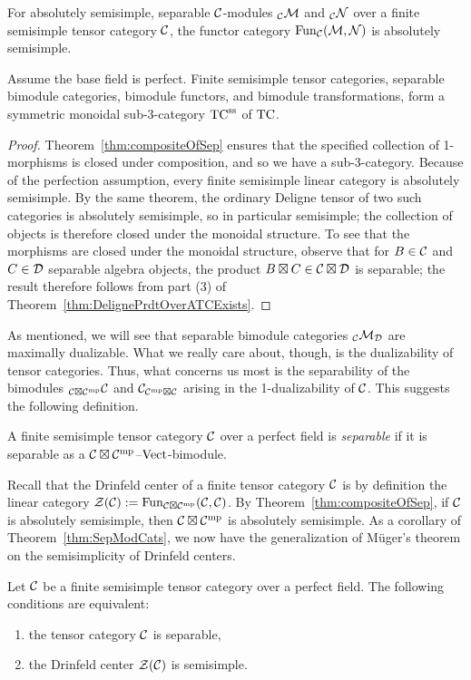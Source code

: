 \documentclass{amsart}
\begin{document}
\begin{corollary} \label{cor:funsemi}
For absolutely semisimple, separable $\mathcal C$-modules ${}_\mathcal C \mathcal M$ and ${}_\mathcal C \mathcal N$ over a finite semisimple tensor category $\mathcal C$, the functor category $\operatorname{Fun}_{\mathcal C}(\mathcal M,\mathcal N)$ is absolutely semisimple.
\end{corollary}

\begin{corollary} \label{cor:septc}
Assume the base field is perfect.  Finite semisimple tensor categories, separable bimodule categories, bimodule functors, and bimodule transformations, form a symmetric monoidal sub-3-category ${\mathrm{TC}^{\mathrm{ss}}}$ of $\mathrm{TC}$.
\end{corollary}
\begin{proof}
Theorem~\ref{thm:compositeOfSep} ensures that the specified collection of 1-morphisms is closed under composition, and so we have a sub-3-category.  Because of the perfection assumption, every finite semisimple linear category is absolutely semisimple.  By the same theorem, the ordinary Deligne tensor of two such categories is absolutely semisimple, so in particular semisimple; the collection of objects is therefore closed under the monoidal structure.  To see that the morphisms are closed under the monoidal structure, observe that for $B \in \mathcal C$ and $C \in \mathcal D$ separable algebra objects, the product $B \boxtimes C \in \mathcal C \boxtimes \mathcal D$ is separable; the result therefore follows from part (3) of Theorem~\ref{thm:DelignePrdtOverATCExists}.
\end{proof}


As mentioned, we will see that separable bimodule categories ${}_\mathcal C \mathcal M_\mathcal D$ are maximally dualizable.  What we really care about, though, is the dualizability of tensor categories.  Thus, what concerns us most is the separability of the bimodules ${}_{\mathcal C \boxtimes \mathcal C^{\mathrm{mp}}} \mathcal C$ and $\mathcal C_{\mathcal C^{\mathrm{mp}} \boxtimes \mathcal C}$ arising in the 1-dualizability of $\mathcal C$.  This suggests the following definition.
\begin{definition} \label{def:sepcat}
A finite semisimple tensor category $\mathcal C$ over a perfect field is \emph{separable} if it is separable as a $\mathcal C \boxtimes \mathcal C^{\mathrm{mp}}$--$\mathrm{Vect}$-bimodule.
\end{definition}

Recall that the Drinfeld center of a finite tensor category $\mathcal C$ is by definition the linear category $\mathcal Z(\mathcal C) := \operatorname{Fun}_{\mathcal C \boxtimes \mathcal C^{\mathrm{mp}}}(\mathcal C,\mathcal C)$.  By Theorem~\ref{thm:compositeOfSep}, if $\mathcal C$ is absolutely semisimple, then $\mathcal C \boxtimes \mathcal C^{\mathrm{mp}}$ is absolutely semisimple.  As a corollary of Theorem~\ref{thm:SepModCats}, we now have the generalization of M\"uger's theorem on the semisimplicity of Drinfeld centers.
\begin{corollary} \label{cor:Sep=semisimplecenter}
Let $\mathcal C$ be a finite semisimple tensor category over a perfect field.  The following conditions are equivalent:
\begin{enumerate}
\item the tensor category $\mathcal C$ is separable,
\item the Drinfeld center $\mathcal Z(\mathcal C)$ is semisimple.
\end{enumerate}
\end{corollary}
\end{document}
